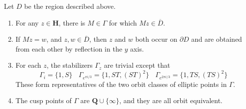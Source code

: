 \begin{theorem}
    Let $D$ be the region described above.
    \begin{enumerate}
        \item For any $z \in \mathbf{H}$, there is $M \in \Gamma$ for which $Mz \in \overline{D}$.
        \item If $Mz = w$, and $z,w \in \overline{D}$, then $z$ and $w$ both occur on $\partial D$ and are obtained from each other by reflection in the $y$ axis.
        \item For each $z$, the stabilizers $\Gamma_z$ are trivial except that
        \[ \Gamma_i = \{ 1, S \}\ \ \ \ \Gamma_{e^{\pi i/3}} = \{ 1, ST, (ST)^2 \}\ \ \ \ \Gamma_{e^{2 \pi i/3}} = \{ 1, TS, (TS)^2 \} \]
        These form representatives of the two orbit classes of elliptic points in $\Gamma$.

        \item The cusp points of $\Gamma$ are $\mathbf{Q} \cup \{ \infty \}$, and they are all orbit equivalent.
    \end{enumerate}
\end{theorem}
